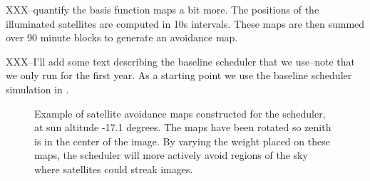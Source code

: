 \documentclass[linenumbers]{aastex631}
\begin{document}
XXX--quantify the basis function maps a bit more. The positions of the illuminated satellites are computed in 10s intervals. These maps are then summed over 90 minute blocks to generate an avoidance map. 

XXX--I'll add some text describing the baseline scheduler that we use--note that we only run for the first year. As a starting point we use the baseline scheduler simulation in \citet{yoachim2022b}.

\begin{figure}[ht!]
\caption{Example of satellite avoidance maps constructed for the scheduler, at sun altitude -17.1 degrees. The maps have been rotated so zenith is in the center of the image. By varying the weight placed on these maps, the scheduler will more actively avoid regions of the sky where satellites could streak images. \label{fig-simulated-scheduler}}
\end{figure}
\end{document}
